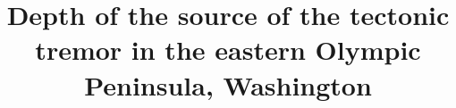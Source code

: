 \documentclass[draft]{agujournal2019}
\begin{document}
%
%


\title{Depth of the source of the tectonic tremor in the eastern Olympic Peninsula, Washington}

%
%











\end{document}
